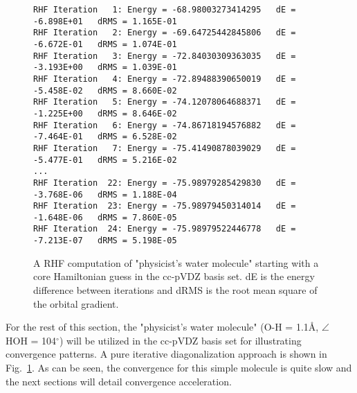\documentclass[aip,jcp,preprint,superscriptaddress,floatfix]{revtex4-1}
\begin{document}
\begin{figure}[htbp]
\begin{center}
\caption{A RHF computation of "physicist's water molecule" starting with a core Hamiltonian guess in the cc-pVDZ basis set. dE is the energy difference between iterations and dRMS is the root mean square of the orbital gradient.}
\label{rhf_water}
{\footnotesize\linespread{1}\normalfont\ttfamily
\begin{verbatim}
RHF Iteration   1: Energy = -68.98003273414295   dE = -6.898E+01   dRMS = 1.165E-01
RHF Iteration   2: Energy = -69.64725442845806   dE = -6.672E-01   dRMS = 1.074E-01
RHF Iteration   3: Energy = -72.84030309363035   dE = -3.193E+00   dRMS = 1.039E-01
RHF Iteration   4: Energy = -72.89488390650019   dE = -5.458E-02   dRMS = 8.660E-02
RHF Iteration   5: Energy = -74.12078064688371   dE = -1.225E+00   dRMS = 8.646E-02
RHF Iteration   6: Energy = -74.86718194576882   dE = -7.464E-01   dRMS = 6.528E-02
RHF Iteration   7: Energy = -75.41490878039029   dE = -5.477E-01   dRMS = 5.216E-02
...
RHF Iteration  22: Energy = -75.98979285429830   dE = -3.768E-06   dRMS = 1.188E-04
RHF Iteration  23: Energy = -75.98979450314014   dE = -1.648E-06   dRMS = 7.860E-05
RHF Iteration  24: Energy = -75.98979522446778   dE = -7.213E-07   dRMS = 5.198E-05
\end{verbatim}
}
\end{center}
\end{figure}

For the rest of this section, the "physicist's water molecule" (O-H = 1.1\AA, $\angle$ HOH = 104$^{\circ}$) will be utilized in the cc-pVDZ basis set for illustrating convergence patterns.
A pure iterative diagonalization approach is shown in Fig.~\ref{rhf_water}.
As can be seen, the convergence for this simple molecule is quite slow and the next sections will detail convergence acceleration.

\newpage



\end{document}

